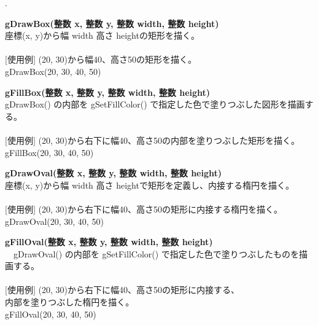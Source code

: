 \documentclass[11pt,a4j]{jarticle}
\newcounter{enum2}
\newenvironment{enumerate2}{%
   \begin{list}%
   {%
      \arabic{enum2}.\ \,%
   }%
   {%
      \usecounter{enum2}
      \setlength{\itemindent}{0zw}%
      \setlength{\leftmargin}{3zw}%
      \setlength{\rightmargin}{0zw}%
      \setlength{\labelsep}{0zw}%
      \setlength{\labelwidth}{3zw}%
      \setlength{\itemsep}{0em}%
      \setlength{\parsep}{0em}%
      \setlength{\listparindent}{0zw}%
   }
}{%
   \end{list}%
}
\begin{document}
\begin{enumerate2}
\item {\bf{gDrawBox(整数 x, 整数 y, 整数 width, 整数 height)}} \\
       座標(x, y)から幅 width 高さ heightの矩形を描く。 \\
\ \\
	 \hspace{10pt}  $[$使用例$]$ (20, 30)から幅40、高さ50の矩形を描く。 \\
         \hspace{55pt}      gDrawBox(20, 30, 40, 50) \\

\item {\bf{gFillBox(整数 x, 整数 y, 整数 width, 整数 height)}} \\
       gDrawBox() の内部を gSetFillColor() で指定した色で塗りつぶした図形を描画する。 \\
\ \\
	 \hspace{10pt}  $[$使用例$]$ (20, 30)から右下に幅40、高さ50の内部を塗りつぶした矩形を描く。 \\
         \hspace{55pt}      gFillBox(20, 30, 40, 50) \\

\item {\bf{gDrawOval(整数 x, 整数 y, 整数 width, 整数 height)}} \\
       座標(x, y)から幅 width 高さ heightで矩形を定義し、内接する楕円を描く。 \\
\ \\
	 \hspace{10pt}  $[$使用例$]$ (20, 30)から右下に幅40、高さ50の矩形に内接する楕円を描く。 \\
         \hspace{55pt}      gDrawOval(20, 30, 40, 50) \\

\item {\bf{gFillOval(整数 x, 整数 y, 整数 width, 整数 height)}} \\
      　gDrawOval() の内部を gSetFillColor() で指定した色で塗りつぶしたものを描画する。 \\
\ \\
	 \hspace{10pt}  $[$使用例$]$ (20, 30)から右下に幅40、高さ50の矩形に内接する、\\
         \hspace{55pt}  内部を塗りつぶした楕円を描く。 \\
         \hspace{55pt}      gFillOval(20, 30, 40, 50) \\


\end{enumerate2}
\end{document}
